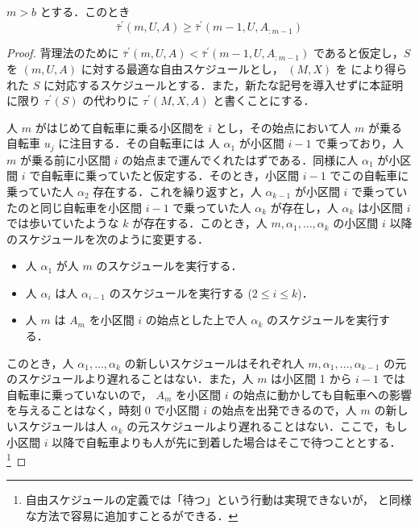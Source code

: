 \begin{lemma}\label{lemma:fsabs-lower-bound-recursive}
  $m > b$ とする．このとき
  \begin{equation}
    \bar\tau^{\prime}(m, U, A) \geq \bar\tau^\prime(m - 1, U, A_{:m-1})
  \end{equation}
\end{lemma}
\begin{proof}
  背理法のために $\bar\tau^{\prime}(m, U, A) < \bar\tau^\prime(m - 1, U, A_{:m-1})$ であると仮定し，$S$ を $(m, U, A)$ に対する最適な自由スケジュールとし， $(M, X)$ を により得られた $S$ に対応するスケジュールとする．また，新たな記号を導入せずに本証明に限り $\tau^\prime(S)$ の代わりに $\tau^\prime(M, X, A)$ と書くことにする．

  人 $m$ がはじめて自転車に乗る小区間を $i$ とし，その始点において人 $m$ が乗る自転車 $u_j$ に注目する．その自転車には 人 $\alpha_1$ が小区間 $i - 1$ で乗っており，人 $m$ が乗る前に小区間 $i$ の始点まで運んでくれたはずである．同様に人 $\alpha_1$ が小区間 $i$ で自転車に乗っていたと仮定する．そのとき，小区間 $i - 1$ でこの自転車に乗っていた人 $\alpha_2$ 存在する．これを繰り返すと，人 $\alpha_{k-1}$ が小区間 $i$ で乗っていたのと同じ自転車を小区間 $i - 1$ で乗っていた人 $\alpha_k$ が存在し，人 $\alpha_k$ は小区間 $i$ では歩いていたような $k$ が存在する．このとき，人 $m,\alpha_1,\ldots,\alpha_k$ の小区間 $i$ 以降のスケジュールを次のように変更する．
  \begin{itemize}
    \item 人 $\alpha_1$ が人 $m$ のスケジュールを実行する．
    \item 人 $\alpha_i$ は人 $\alpha_{i-1}$ のスケジュールを実行する ($2 \leq i \leq k$)．
    \item 人 $m$ は $A_m$ を小区間 $i$ の始点とした上で人 $\alpha_k$ のスケジュールを実行する．
  \end{itemize}
  このとき，人 $\alpha_1,\ldots,\alpha_k$ の新しいスケジュールはそれぞれ人 $m,\alpha_1,\ldots,\alpha_{k-1}$ の元のスケジュールより遅れることはない．また，人 $m$ は小区間 1 から $i - 1$ では自転車に乗っていないので， $A_m$ を小区間 $i$ の始点に動かしても自転車への影響を与えることはなく，時刻 0 で小区間 $i$ の始点を出発できるので，人 $m$ の新しいスケジュールは人 $\alpha_k$ の元スケジュールより遅れることはない．ここで，もし小区間 $i$ 以降で自転車よりも人が先に到着した場合はそこで待つこととする．\footnote{自由スケジュールの定義では「待つ」という行動は実現できないが，  と同様な方法で容易に追加すことるができる．}


\end{proof}
